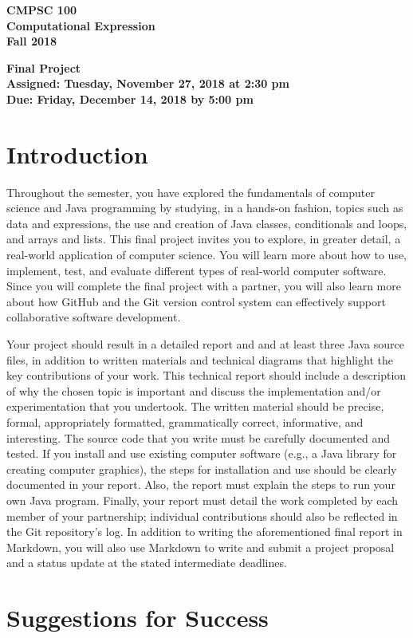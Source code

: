 \documentclass[11pt]{article}
\newcommand{\assignmentduedate}{December 14}
\newcommand{\assignmentassignedate}{November 27}
\newcommand{\labyear}{2018}
\newcommand{\labday}{Tuesday}
\newcommand{\labdueday}{Friday}
\newcommand{\labtime}{2:30 pm}
\newcommand{\labduetime}{5:00 pm}
\newcommand{\assigneddate}{Assigned: \labday, \assignmentassignedate, \labyear{} at \labtime{}}
\newcommand{\duedate}{Due: \labdueday, \assignmentduedate, \labyear{} by \labduetime{}}
\newcommand{\labtitle}[1]
{
  \begin{center}
    \begin{center}
      \bf
      CMPSC 100\\Computational Expression\\
      Fall 2018\\
      \medskip
    \end{center}
    \bf
    #1
  \end{center}
}
\begin{document}
\thispagestyle{empty}

\labtitle{Final Project \\ \assigneddate{} \\ \duedate{}}

\section*{Introduction}

Throughout the semester, you have explored the fundamentals of computer science
and Java programming by studying, in a hands-on fashion, topics such as data and
expressions, the use and creation of Java classes, conditionals and loops, and
arrays and lists. This final project invites you to explore, in greater detail,
a real-world application of computer science. You will learn more about how to
use, implement, test, and evaluate different types of real-world computer
software. Since you will complete the final project with a partner, you will
also learn more about how GitHub and the Git version control system can
effectively support collaborative software development.

Your project should result in a detailed report and and at least three Java
source files, in addition to written materials and technical diagrams that
highlight the key contributions of your work. This technical report should
include a description of why the chosen topic is important and discuss the
implementation and/or experimentation that you undertook. The written material
should be precise, formal, appropriately formatted, grammatically correct,
informative, and interesting. The source code that you write must be carefully
documented and tested. If you install and use existing computer software (e.g.,
a Java library for creating computer graphics), the steps for installation and
use should be clearly documented in your report. Also, the report must explain
the steps to run your own Java program. Finally, your report must detail the
work completed by each member of your partnership; individual contributions
should also be reflected in the Git repository's log. In addition to writing the
aforementioned final report in Markdown, you will also use Markdown to write and
submit a project proposal and a status update at the stated intermediate
deadlines.

\section*{Suggestions for Success}
\end{document}

